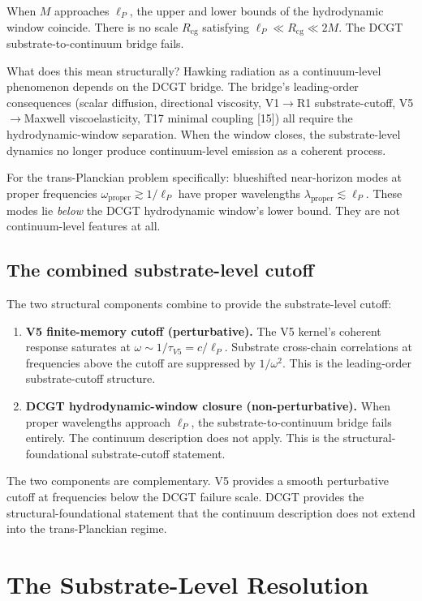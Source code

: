 \documentclass[11pt,a4paper]{article}
\begin{document}
When $M$ approaches $\ell_P$, the upper and lower bounds of the hydrodynamic window coincide. There is no scale $R_\mathrm{cg}$ satisfying $\ell_P \ll R_\mathrm{cg} \ll 2M$. The DCGT substrate-to-continuum bridge fails.

What does this mean structurally? Hawking radiation as a continuum-level phenomenon depends on the DCGT bridge. The bridge's leading-order consequences (scalar diffusion, directional viscosity, V1$\to$R1 substrate-cutoff, V5$\to$Maxwell viscoelasticity, T17 minimal coupling [15]) all require the hydrodynamic-window separation. When the window closes, the substrate-level dynamics no longer produce continuum-level emission as a coherent process.

For the trans-Planckian problem specifically: blueshifted near-horizon modes at proper frequencies $\omega_\mathrm{proper} \gtrsim 1/\ell_P$ have proper wavelengths $\lambda_\mathrm{proper} \lesssim \ell_P$. These modes lie \emph{below} the DCGT hydrodynamic window's lower bound. They are not continuum-level features at all.

\subsection{The combined substrate-level cutoff}

The two structural components combine to provide the substrate-level cutoff:

\begin{enumerate}[noitemsep]
\item \textbf{V5 finite-memory cutoff (perturbative).} The V5 kernel's coherent response saturates at $\omega \sim 1/\tau_{V5} = c/\ell_P$. Substrate cross-chain correlations at frequencies above the cutoff are suppressed by $1/\omega^{2}$. This is the leading-order substrate-cutoff structure.
\item \textbf{DCGT hydrodynamic-window closure (non-perturbative).} When proper wavelengths approach $\ell_P$, the substrate-to-continuum bridge fails entirely. The continuum description does not apply. This is the structural-foundational substrate-cutoff statement.
\end{enumerate}

The two components are complementary. V5 provides a smooth perturbative cutoff at frequencies below the DCGT failure scale. DCGT provides the structural-foundational statement that the continuum description does not extend into the trans-Planckian regime.

\section{The Substrate-Level Resolution}
\end{document}
